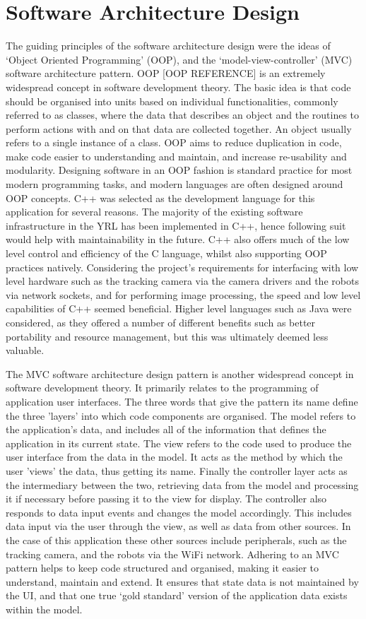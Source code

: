 \section{Software Architecture Design}
The guiding principles of the software architecture design were the ideas of `Object Oriented Programming' (OOP), and the `model-view-controller' (MVC) software architecture pattern. OOP [OOP REFERENCE] is an extremely widespread concept in software development theory. The basic idea is that code should be organised into units based on individual functionalities, commonly referred to as classes, where the data that describes an object and the routines to perform actions with and on that data are collected together. An object usually refers to a single instance of a class. OOP aims to reduce duplication in code, make code easier to understanding and maintain, and increase re-usability and modularity. Designing software in an OOP fashion is standard practice for most modern programming tasks, and modern languages are often designed around OOP concepts. C++ was selected as the development language for this application for several reasons. The majority of the existing software infrastructure in the YRL has been implemented in C++, hence following suit would help with maintainability in the future. C++ also offers much of the low level control and efficiency of the C language, whilst also supporting OOP practices natively. Considering the project's requirements for interfacing with low level hardware such as the tracking camera via the camera drivers and the robots via network sockets, and for performing image processing, the speed and low level capabilities of C++ seemed beneficial. Higher level languages such as Java were considered, as they offered a number of different benefits such as better portability and resource management, but this was ultimately deemed less valuable.

The MVC software architecture design pattern is another widespread concept in software development theory. It primarily relates to the programming of application user interfaces. The three words that give the pattern its name define the three 'layers' into which code components are organised. The model refers to the application's data, and includes all of the information that defines the application in its current state. The view refers to the code used to produce the user interface from the data in the model. It acts as the method by which the user 'views' the data, thus getting its name. Finally the controller layer acts as the intermediary between the two, retrieving data from the model and processing it if necessary before passing it to the view for display. The controller also responds to data input events and changes the model accordingly. This includes data input via the user through the view, as well as data from other sources. In the case of this application these other sources include peripherals, such as the tracking camera, and the robots via the WiFi network. Adhering to an MVC pattern helps to keep code structured and organised, making it easier to understand, maintain and extend. It ensures that state data is not maintained by the UI, and that one true `gold standard' version of the application data exists within the model. 


